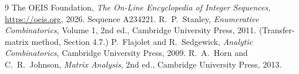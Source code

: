 \documentclass[11pt,a4paper]{article}
\theoremstyle{plain}
\theoremstyle{definition}
\begin{document}
\begin{thebibliography}{9}
 The OEIS Foundation, \emph{The On-Line Encyclopedia of Integer
Sequences}, \url{https://oeis.org}, 2026. Sequence A234221.
 R.~P.~Stanley, \emph{Enumerative Combinatorics}, Volume 1, 2nd ed.,
Cambridge University Press, 2011. (Transfer-matrix method, Section 4.7.)
 P.~Flajolet and R.~Sedgewick, \emph{Analytic Combinatorics}, Cambridge
University Press, 2009.
 R.~A.~Horn and C.~R.~Johnson, \emph{Matrix Analysis}, 2nd ed., Cambridge
University Press, 2013.
\end{thebibliography}
\end{document}
